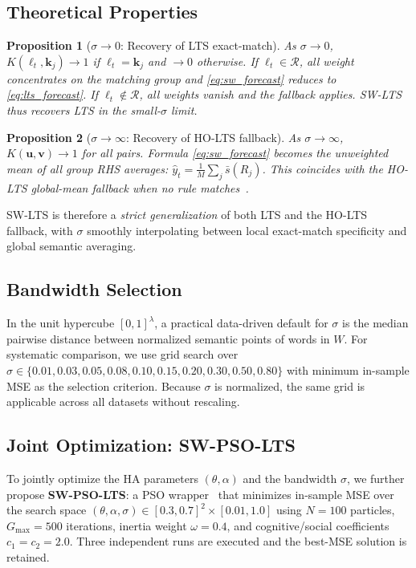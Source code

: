 \documentclass[conference]{IEEEtran}
\newtheorem{proposition}{Proposition}
\begin{document}
\subsection{Theoretical Properties}

\begin{proposition}[$\sigma \to 0$: Recovery of LTS exact-match]
As $\sigma \to 0$, $K(\bm{\ell}_t, \bm{k}_j) \to 1$ if
$\bm{\ell}_t = \bm{k}_j$ and $\to 0$ otherwise. If
$\bm{\ell}_t \in \mathcal{R}$, all weight concentrates on the
matching group and \eqref{eq:sw_forecast} reduces to
\eqref{eq:lts_forecast}. If $\bm{\ell}_t \notin \mathcal{R}$, all
weights vanish and the fallback applies. SW-LTS thus recovers
LTS in the small-$\sigma$ limit.
\end{proposition}

\begin{proposition}[$\sigma \to \infty$: Recovery of HO-LTS fallback]
As $\sigma \to \infty$, $K(\bm{u}, \bm{v}) \to 1$ for all pairs.
Formula \eqref{eq:sw_forecast} becomes the unweighted mean of all
group RHS averages: $\hat{y}_t = \frac{1}{M}\sum_j \bar{s}(R_j)$.
This coincides with the HO-LTS global-mean fallback when no rule
matches~\cite{hieu2021holts}.
\end{proposition}

SW-LTS is therefore a \emph{strict generalization} of both LTS and
the HO-LTS fallback, with $\sigma$ smoothly interpolating between
local exact-match specificity and global semantic averaging.

\subsection{Bandwidth Selection}

In the unit hypercube $[0,1]^\lambda$, a practical data-driven default
for $\sigma$ is the median pairwise distance between normalized
semantic points of words in $W$. For systematic comparison, we use
grid search over $\sigma \in \{0.01, 0.03, 0.05, 0.08, 0.10, 0.15,
0.20, 0.30, 0.50, 0.80\}$ with minimum in-sample MSE as the selection
criterion. Because $\sigma$ is normalized, the same grid is applicable
across all datasets without rescaling.

\subsection{Joint Optimization: SW-PSO-LTS}

To jointly optimize the HA parameters $(\theta, \alpha)$ and the
bandwidth $\sigma$, we further propose \textbf{SW-PSO-LTS}: a PSO
wrapper~\cite{kennedy1995pso} that minimizes in-sample MSE over the
search space $(\theta,\alpha,\sigma) \in [0.3,0.7]^2 \times [0.01,1.0]$
using $N=100$ particles, $G_{\max}=500$ iterations, inertia weight
$\omega=0.4$, and cognitive/social coefficients $c_1=c_2=2.0$. Three
independent runs are executed and the best-MSE solution is retained.
\end{document}
